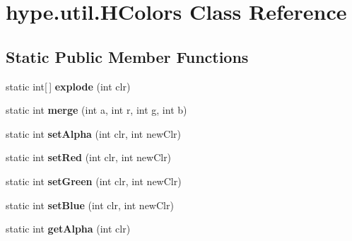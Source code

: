 \hypertarget{classhype_1_1util_1_1_h_colors}{\section{hype.\-util.\-H\-Colors Class Reference}
\label{classhype_1_1util_1_1_h_colors}
}
\subsection*{Static Public Member Functions}
\begin{DoxyCompactItemize}
\item 
\hypertarget{classhype_1_1util_1_1_h_colors_aa113b970194bcc69151bcf76a558cdb6}{static int\mbox{[}$\,$\mbox{]} {\bfseries explode} (int clr)}\label{classhype_1_1util_1_1_h_colors_aa113b970194bcc69151bcf76a558cdb6}

\item 
\hypertarget{classhype_1_1util_1_1_h_colors_a3bf6d27e7d286aa334b32ff25350a7f9}{static int {\bfseries merge} (int a, int r, int g, int b)}\label{classhype_1_1util_1_1_h_colors_a3bf6d27e7d286aa334b32ff25350a7f9}

\item 
\hypertarget{classhype_1_1util_1_1_h_colors_a7571037b172df3aac7062839eb3341f9}{static int {\bfseries set\-Alpha} (int clr, int new\-Clr)}\label{classhype_1_1util_1_1_h_colors_a7571037b172df3aac7062839eb3341f9}

\item 
\hypertarget{classhype_1_1util_1_1_h_colors_af46e8ff8a369489f9e6f81869f27a69a}{static int {\bfseries set\-Red} (int clr, int new\-Clr)}\label{classhype_1_1util_1_1_h_colors_af46e8ff8a369489f9e6f81869f27a69a}

\item 
\hypertarget{classhype_1_1util_1_1_h_colors_a51523cc99cdcd4da531babdb6d68a7f1}{static int {\bfseries set\-Green} (int clr, int new\-Clr)}\label{classhype_1_1util_1_1_h_colors_a51523cc99cdcd4da531babdb6d68a7f1}

\item 
\hypertarget{classhype_1_1util_1_1_h_colors_ad980bb10d1689405069bfe262e6421bf}{static int {\bfseries set\-Blue} (int clr, int new\-Clr)}\label{classhype_1_1util_1_1_h_colors_ad980bb10d1689405069bfe262e6421bf}

\item 
\hypertarget{classhype_1_1util_1_1_h_colors_a027e18d7ca268ac4820ac97b53e29c9b}{static int {\bfseries get\-Alpha} (int clr)}\label{classhype_1_1util_1_1_h_colors_a027e18d7ca268ac4820ac97b53e29c9b}


\end{DoxyCompactItemize}
